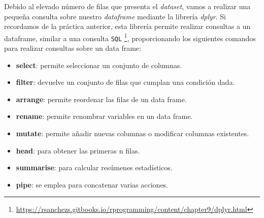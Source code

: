 \documentclass [a4paper] {article}
\begin{document}
Debido al elevado número de filas que presenta el \textit{dataset}, vamos a realizar una pequeña consulta sobre nuestro \textit{dataframe} mediante la librería \textit{dplyr}.
Si recordamos de la práctica anterior, esta librería permite realizar consultas a un dataframe, similar a una consulta \texttt{SQL} \footnote{\url{https://rsanchezs.gitbooks.io/rprogramming/content/chapter9/dplyr.html}}, proporcionando los siguientes comandos para realizar consultas sobre un data frame:
\begin{itemize}
	\item \textbf{select}: permite seleccionar un conjunto de columnas.
	\item \textbf{filter}: devuelve un conjunto de filas que cumplan una condición dada.
	\item \textbf{arrange}: permite reordenar las filas de un data frame.
	\item \textbf{rename}: permite renombrar variables en un data frame.
	\item \textbf{mutate}: permite añadir nuevas columnas o modificar columnas existentes.
	\item \textbf{head}: para obtener las primeras n filas.
	\item \textbf{summarise}: para calcular resúmenes estadísticos.
    \item \textbf{pipe}: se emplea para concatenar varias acciones.
\end{itemize}
\end{document}
